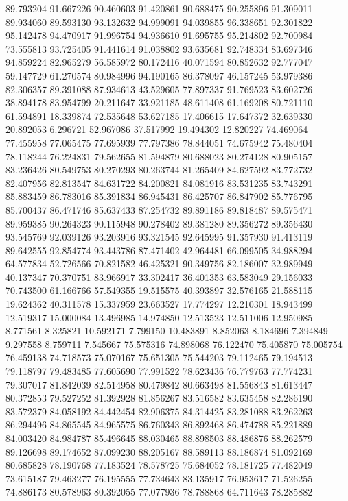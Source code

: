 89.793204
91.667226
90.460603
91.420861
90.688475
90.255896
91.309011
89.934060
89.593130
93.132632
94.999091
94.039855
96.338651
92.301822
95.142478
94.470917
91.996754
94.936610
91.695755
95.214802
92.700984
73.555813
93.725405
91.441614
91.038802
93.635681
92.748334
83.697346
94.859224
82.965279
56.585972
80.172416
40.071594
80.852632
92.777047
59.147729
61.270574
80.984996
94.190165
86.378097
46.157245
53.979386
82.306357
89.391088
87.934613
43.529605
77.897337
91.769523
83.602726
38.894178
83.954799
20.211647
33.921185
48.611408
61.169208
80.721110
61.594891
18.339874
72.535648
53.627185
17.406615
17.647372
32.639330
20.892053
6.296721
52.967086
37.517992
19.494302
12.820227
74.469064
77.455958
77.065475
77.695939
77.797386
78.844051
74.675942
75.480404
78.118244
76.224831
79.562655
81.594879
80.688023
80.274128
80.905157
83.236426
80.549753
80.270293
80.263744
81.265409
84.627592
83.772732
82.407956
82.813547
84.631722
84.200821
84.081916
83.531235
83.743291
85.883459
86.783016
85.391834
86.945431
86.425707
86.847902
85.776795
85.700437
86.471746
85.637433
87.254732
89.891186
89.818487
89.575471
89.959385
90.264323
90.115948
90.278402
89.381280
89.356272
89.356430
93.545769
92.039126
93.203916
93.321545
92.645995
91.357930
91.413119
89.642555
92.854774
93.443786
87.471402
42.964481
66.099505
34.988294
64.577834
52.726566
70.821582
46.425321
90.349756
82.186007
32.989949
40.137347
70.370751
83.966917
33.302417
36.401353
63.583049
29.156033
70.743500
61.166766
57.549355
19.515575
40.393897
32.576165
21.588115
19.624362
40.311578
15.337959
23.663527
17.774297
12.210301
18.943499
12.519317
15.000084
13.496985
14.974850
12.513523
12.511006
12.950985
8.771561
8.325821
10.592171
7.799150
10.483891
8.852063
8.184696
7.394849
9.297558
8.759711
7.545667
75.575316
74.898068
76.122470
75.405870
75.005754
76.459138
74.718573
75.070167
75.651305
75.544203
79.112465
79.194513
79.118797
79.483485
77.605690
77.991522
78.623436
76.779763
77.774231
79.307017
81.842039
82.514958
80.479842
80.663498
81.556843
81.613447
80.372853
79.527252
81.392928
81.856267
83.516582
83.635458
82.286190
83.572379
84.058192
84.442454
82.906375
84.314425
83.281088
83.262263
86.294496
84.865545
84.965575
86.760343
86.892468
86.474788
85.221889
84.003420
84.984787
85.496645
88.030465
88.898503
88.486876
88.262579
89.126698
89.174652
87.099230
88.205167
88.589113
88.186874
81.092169
80.685828
78.190768
77.183524
78.578725
75.684052
78.181725
77.482049
73.615187
79.463277
76.195555
77.734643
83.135917
76.953617
71.526255
74.886173
80.578963
80.392055
77.077936
78.788868
64.711643
78.285882
